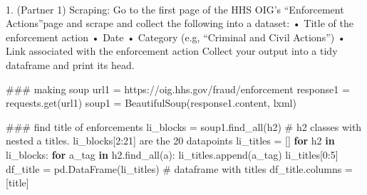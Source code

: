 \documentclass[
  letterpaper,
  DIV=11,
  numbers=noendperiod]{scrartcl}
\makeatletter
\let\oldparagraph\paragraph
\renewcommand{\paragraph}{
    \@ifstar
      \xxxParagraphStar
      \xxxParagraphNoStar
  }
\newcommand{\xxxParagraphStar}[1]{\oldparagraph*{#1}\mbox{}}
\newcommand{\xxxParagraphNoStar}[1]{\oldparagraph{#1}\mbox{}}
\newenvironment{Shaded}{\begin{snugshade}}{\end{snugshade}}
\newcommand{\CommentTok}[1]{\textcolor[rgb]{0.37,0.37,0.37}{#1}}
\newcommand{\ControlFlowTok}[1]{\textcolor[rgb]{0.00,0.23,0.31}{\textbf{#1}}}
\newcommand{\DecValTok}[1]{\textcolor[rgb]{0.68,0.00,0.00}{#1}}
\newcommand{\KeywordTok}[1]{\textcolor[rgb]{0.00,0.23,0.31}{\textbf{#1}}}
\newcommand{\NormalTok}[1]{\textcolor[rgb]{0.00,0.23,0.31}{#1}}
\newcommand{\OperatorTok}[1]{\textcolor[rgb]{0.37,0.37,0.37}{#1}}
\newcommand{\StringTok}[1]{\textcolor[rgb]{0.13,0.47,0.30}{#1}}
\makeatother
\begin{document}
\paragraph{1. (Partner 1) Scraping: Go to the first page of the HHS
OIG's ``Enforcement Actions''page and scrape and collect the following
into a dataset: • Title of the enforcement action • Date • Category
(e.g, ``Criminal and Civil Actions'') • Link associated with the
enforcement action Collect your output into a tidy dataframe and print
its
head.}\label{partner-1-scraping-go-to-the-first-page-of-the-hhs-oigs-enforcement-actionspage-and-scrape-and-collect-the-following-into-a-dataset-title-of-the-enforcement-action-date-category-e.g-criminal-and-civil-actions-link-associated-with-the-enforcement-action-collect-your-output-into-a-tidy-dataframe-and-print-its-head.}

\begin{Shaded}
\begin{Highlighting}[]
\CommentTok{\#\#\# making soup}
\NormalTok{url1 }\OperatorTok{=} \StringTok{\textquotesingle{}https://oig.hhs.gov/fraud/enforcement\textquotesingle{}}
\NormalTok{response1 }\OperatorTok{=}\NormalTok{ requests.get(url1)}
\NormalTok{soup1 }\OperatorTok{=}\NormalTok{ BeautifulSoup(response1.content, }\StringTok{\textquotesingle{}lxml\textquotesingle{}}\NormalTok{)}
\end{Highlighting}
\end{Shaded}

\begin{Shaded}
\begin{Highlighting}[]
\CommentTok{\#\#\# find title of enforcements}
\NormalTok{li\_blocks }\OperatorTok{=}\NormalTok{ soup1.find\_all(}\StringTok{\textquotesingle{}h2\textquotesingle{}}\NormalTok{) }\CommentTok{\# h2 classes with nested \textquotesingle{}a\textquotesingle{} titles. li\_blocks[2:21] are the 20 datapoints}
\NormalTok{li\_titles }\OperatorTok{=}\NormalTok{ []}
\ControlFlowTok{for}\NormalTok{ h2 }\KeywordTok{in}\NormalTok{ li\_blocks:}
    \ControlFlowTok{for}\NormalTok{ a\_tag }\KeywordTok{in}\NormalTok{ h2.find\_all(}\StringTok{\textquotesingle{}a\textquotesingle{}}\NormalTok{):}
\NormalTok{        li\_titles.append(a\_tag)}
\NormalTok{li\_titles[}\DecValTok{0}\NormalTok{:}\DecValTok{5}\NormalTok{]}
\NormalTok{df\_title }\OperatorTok{=}\NormalTok{ pd.DataFrame(li\_titles) }\CommentTok{\# dataframe with titles}
\NormalTok{df\_title.columns }\OperatorTok{=}\NormalTok{ [}\StringTok{\textquotesingle{}title\textquotesingle{}}\NormalTok{]}
\end{Highlighting}
\end{Shaded}
\end{document}
